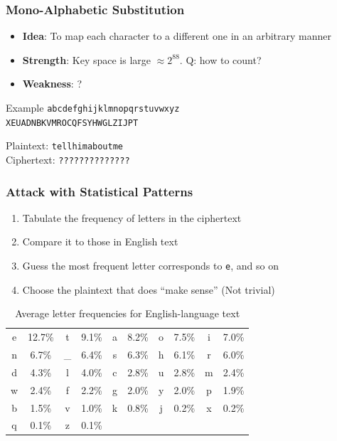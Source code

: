 \begin{frame}[fragile]\frametitle{Mono-Alphabetic Substitution}
\begin{itemize}
\item \textbf{Idea}: To map each character to a different one in an arbitrary manner
\item \textbf{Strength}: Key space is large $\approx 2^{88}$. \alert{Q: how to count?}
\item \textbf{Weakness}: ? %
\end{itemize}
\begin{exampleblock}{Example}
\verb|abcdefghijklmnopqrstuvwxyz|\\
\verb|XEUADNBKVMROCQFSYHWGLZIJPT|

Plaintext: \verb|tellhimaboutme|\\
Ciphertext: \verb|??????????????|
\end{exampleblock}
\end{frame}
\begin{frame}[fragile]\frametitle{Attack with Statistical Patterns}
\begin{enumerate}
\item Tabulate the frequency of letters in the ciphertext
\item Compare it to those in English text
\item Guess the most frequent letter corresponds to \verb|e|, and so on
\item Choose the plaintext that does ``make sense'' (Not trivial)
\end{enumerate}
\begin{table}
\begin{center}
\caption{Average letter frequencies for English-language text}
\begin{tabular}{|cc|cc|cc|cc|cc|} \hline
e & 12.7\% & t & 9.1\% & a & 8.2\% & o & 7.5\% & i & 7.0\%\\
n & 6.7\% & \_ & 6.4\% & s & 6.3\% & h & 6.1\% & r & 6.0\%\\
d & 4.3\% & l & 4.0\% & c & 2.8\% & u & 2.8\% & m & 2.4\%\\
w & 2.4\% & f & 2.2\% & g & 2.0\% & y & 2.0\% & p & 1.9\%\\
b & 1.5\% & v & 1.0\% & k & 0.8\% & j & 0.2\% & x & 0.2\%\\
q & 0.1\% & z & 0.1\% & & & & & &\\ \hline
\end{tabular}
\end{center}
\end{table}
\end{frame}
